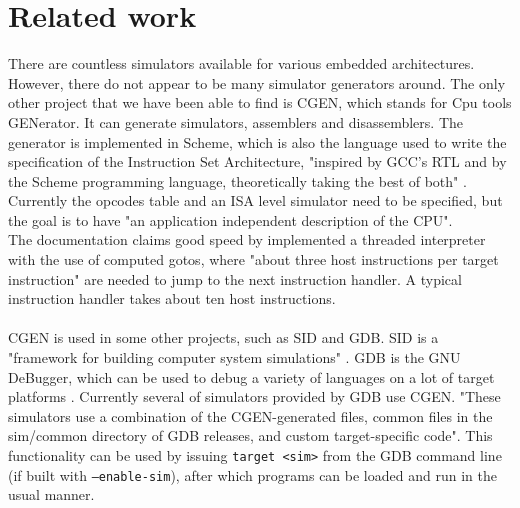 \chapter{Related work}
There are countless simulators available for various embedded architectures.
However, there do not appear to be many simulator generators around. The only
other project that we have been able to find is CGEN, which stands for
Cpu tools GENerator. It can generate simulators, assemblers and disassemblers. 
The generator is implemented in Scheme, which is also the
language used to write the specification of the Instruction Set Architecture,
"inspired by GCC's RTL and by the Scheme programming language, theoretically
taking the best of both" \cite{CGEN}.\\
Currently the opcodes table and an ISA level simulator need to be specified, 
but the goal is to have "an application independent description of the CPU".\\
The documentation claims good speed by implemented a threaded interpreter with
the use of computed gotos, where "about three host instructions per target
instruction" are needed to jump to the next instruction handler. A typical
instruction handler takes about ten host instructions.\\
\\
CGEN is used in some other projects, such as SID and GDB. SID is a "framework
for building computer system simulations" \cite{SID}. GDB is the GNU DeBugger,
which can be used to debug a variety of languages on a lot of target
platforms \cite{GDB}. Currently several of
simulators provided by GDB use CGEN. "These simulators use
a combination of the CGEN-generated files, common files in the sim/common
directory of GDB releases, and custom target-specific code". This
functionality can be used by issuing 
\texttt{target \textless sim\textgreater} from the GDB command
line (if built with \texttt{--enable-sim}), after which programs can be loaded
and run in the usual manner.
